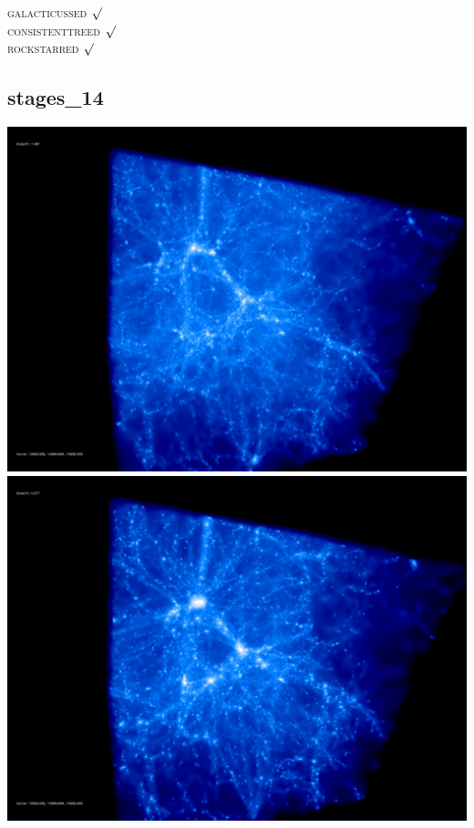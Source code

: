 \textsc{galacticussed} $\surd$ \\
\textsc{consistenttreed} $\surd$ \\ 
\textsc{rockstarred} $\surd$
% 
%
%
%
%
%
%
%

\newpage
\subsection{stages\_14}

\includegraphics[scale=0.1]{r256/stages_14/50.jpg} 
\includegraphics[scale=0.1]{r256/stages_14/100.jpg}  \\

